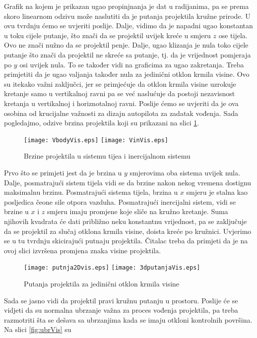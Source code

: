 Grafik na kojem je prikazan ugao propinjnanja je dat u radijanima, pa se prema skoro linearnom 
odzivu može naslutiti da je putanja projektila kružne prirode. U ovu tvrdnju ćemo se uvjeriti poslije. Dalje,
vidimo da je napadni ugao konstantan u toku cijele putanje, što znači da se projektil uvijek kreće u smjeru $z$ ose tijela.
Ovo ne znači nužno da se projektil penje. Dalje, ugao klizanja je nula toko cijele putanje što 
znači da projektil ne skreće sa putanje, tj. da je vrijednost pomjeraja po $y$ osi uvijek nula. To se također 
vidi na graficima za ugao zakretanja. Treba primjetiti da je ugao valjanja također nula za jedinični otklon 
krmila visine. Ovo su itekako važni zaključci, jer se primjećuje da otklon krmila visine uzrokuje 
kretanje samo u vertikalnoj ravni pa se već naslućuje da postoji nezavisnost kretanja u vertikalnoj i horiznotalnoj 
ravni. Poslije ćemo se uvjeriti da je ova osobina od krucijalne važnosti za dizajn autopilota za zadatak vođenja. 
Sada pogledajmo, odzive brzina projektila koji su prikazani na slici \ref{fig:brzine}.
\begin{figure}[!ht]
    \centering 
    \texttt{[image: VbodyVis.eps]}
    \texttt{[image: VinVis.eps]}
    \caption{Brzine projektila u sistemu tijea i inercijalnom sistemu}
    \label{fig:brzine}
\end{figure}
Prvo što se primjeti jest da je brzina u $y$ smjerovima oba sistema uvijek nula. Dalje, posmatrajući 
sistem tijela vidi se da brzine nakon nekog vremena dostignu maksimalnu brzinu. Posmatrajući
sistema tijela, brzina u $x$ smjeru je stalna kao posljedica čeone sile otpora vazduha. Posmatrajući
inercijalni sistem, vidi se brzine u $x$ i $z$ smjeru imaju promjene koje sliče na kružno kretanje. Suma njihovih kvadrata 
će dati približno neku konstantnu vrijednost, pa se zaključuje da se projektil za slučaj otklona krmila visine, 
doista kreće po kružnici. Uvjerimo se u tu tvrdnju skicirajući putnaju projektila. Čitalac treba 
da primjeti da je na ovoj slici izvršena promjena znaka visine projektila. 
\begin{figure}[!ht]
    \centering 
    \texttt{[image: putnja2Dvis.eps]}
    \texttt{[image: 3dputanjaVis.eps]}
    \caption{Putanja projektila za jedinični otklon krmila visine}
    \label{fig:2dpath}
\end{figure}
Sada se jasno vidi da projektil pravi kružnu putanju u prostoru. 
Poslije će se vidjeti da su normalna ubrzanje važna za proces vođenja projektila, pa treba razmotriti 
šta se dešava sa ubrzanjima kada se imaju otkloni kontrolnih površina. Na slici \ref{fig:ubrVis} su 
